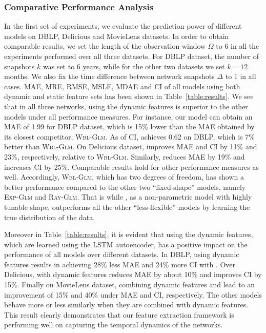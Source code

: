 \subsubsection{Comparative Performance Analysis}
In the first set of experiments, we evaluate the prediction power of different models on DBLP, Delicious and MovieLens datasets. In order to obtain comparable results, we set the length of the observation window $\Omega$ to 6 in all the experiments performed over all three datasets. For DBLP dataset, the number of snapshots $k$ was set to 6 years, while for the other two datasets we set $k=12$ months. We also fix the time difference between network snapshots $\Delta$ to 1 in all cases. MAE, MRE, RMSE, MSLE, MDAE and CI of all models using both dynamic and static feature sets has been shown in Table~\ref{table:results}. We see that in all three networks, \npglm using the dynamic features is superior to the other models under all performance measures. For instance, our model \npglm can obtain an MAE of 1.99 for DBLP dataset, which is 15\% lower than the MAE obtained by its closest competitor, \textsc{Wbl-Glm}. As of CI, \npglm achieves 0.62 on DBLP, which is 7\% better than \textsc{Wbl-Glm}. 
On Delicious dataset, \npglm improves MAE and CI by 11\% and 23\%, respectively, relative to \textsc{Wbl-Glm}. Similarly, \npglm reduces MAE by 19\% and increases CI by 25\%. Comparable results hold for other performance measures as well. Accordingly, \textsc{Wbl-Glm}, which has two degrees of freedom, has shown a better performance compared to the other two ``fixed-shape'' models, namely \textsc{Exp-Glm} and \textsc{Ray-Glm}. That is while \npglm, as a non-parametric model with highly tunable shape, outperforms all the other ``less-flexible'' models by learning the true distribution of the data.

Moreover in Table~\ref{table:results}, it is evident that using the dynamic features, which are learned using the LSTM autoencoder, has a positive impact on the performance of all models over different datasets. In DBLP, using dynamic features results in achieving 28\% less MAE and 24\% more CI with \npglm. Over Delicious, \npglm with dynamic features reduces MAE by about 10\% and improves CI by 15\%. Finally on MovieLens dataset, combining dynamic features and \npglm lead to an improvement of 15\% and 40\% under MAE and CI, respectively. The other models behave more or less similarly when they are combined with dynamic features. This result clearly demonstrates that our feature extraction framework is performing well on capturing the temporal dynamics of the networks.


